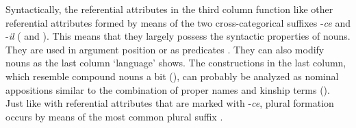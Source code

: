 Syntactically, the referential attributes in the third column function like other referential attributes formed by means of the two cross-categorical suffixes -\textit{ce} and -\textit{il} ( and ). This means that they largely possess the syntactic properties of nouns. They are used in argument position  or as predicates . They can also modify nouns as the last column `language' shows. The constructions in the last column, which resemble compound nouns a bit (), can probably be analyzed as nominal appositions similar to the combination of proper names and kinship terms (). Just like with referential attributes that are marked with -\textit{ce}, plural formation occurs by means of the most common plural suffix  . 

